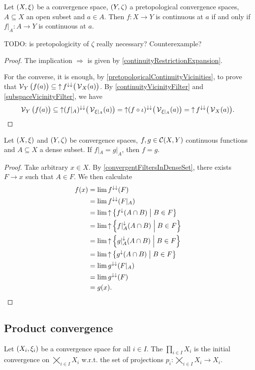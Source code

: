 \begin{proposition} \label{continuityExpandedDomain}
Let $\sSet{X,\xi}$ be a convergence space, $\sSet{Y,\zeta}$ a pretopological convergence spaces, $A\subseteq X$ an open subset and $a\in A$. Then $f: X\to Y$ is continuous at $a$ \textup{if and only if} $f|_A: A\to Y$ is continuous at $a$.
\end{proposition}
TODO: is pretopologicity of $\zeta$ really necessary? Counterexample?
\begin{proof}
The implication $\Rightarrow$ is given by \ref{continuityRestrictionExpansion}.

For the converse, it is enough, by \ref{pretopologicalContinuityVicinities}, to prove that $\operatorname{\mathcal{V}}_Y\big(f(a)\big) \subseteq \operatorname{\uparrow} f^{\downarrow\downarrow}\big(\operatorname{\mathcal{V}}_{X}(a)\big)$.
By \ref{continuityVicinityFilter} and \ref{subspaceVicinityFilter}, we have
\[ \operatorname{\mathcal{V}}_Y\big(f(a)\big) \subseteq \operatorname{\uparrow} (f|_A)^{\downarrow\downarrow}\big(\operatorname{\mathcal{V}}_{\xi|_A}(a)\big) = \operatorname{\uparrow} (f\circ \iota)^{\downarrow\downarrow}\big(\operatorname{\mathcal{V}}_{\xi|_A}(a)\big) = \operatorname{\uparrow} f^{\downarrow\downarrow}\big(\operatorname{\mathcal{V}}_{X}(a)\big). \]
\end{proof}

\begin{lemma} \label{denseSetDeterminesContinuousFunction}
Let $\sSet{X,\xi}$ and $\sSet{Y, \zeta}$ be convergence spaces, $f,g\in \operatorname{\mathcal{C}}(X,Y)$ continuous functions and $A\subseteq X$ a dense subset. If $f|_A = g|_A$, then $f = g$.
\end{lemma}
\begin{proof}
Take arbitrary $x \in X$. By \ref{convergentFiltersInDenseSet}, there exists $F\to x$ such that $A\in F$. We then calculate
\begin{align*}
f(x) &= \lim f^{\imf\imf}(F) \\
&= \lim f^{\imf\imf}(F|_A) \\
&= \lim \upset \setbuilder{f^\imf(A\cap B)}{B\in F} \\
&= \lim \upset \setbuilder{f|_A^\imf(A\cap B)}{B\in F} \\
&= \lim \upset \setbuilder{g|_A^\imf(A\cap B)}{B\in F} \\
&= \lim \upset \setbuilder{g^\imf(A\cap B)}{B\in F} \\
&= \lim g^{\imf\imf}(F|_A) \\
&= \lim g^{\imf\imf}(F) \\
&= g(x).
\end{align*}
\end{proof}

\subsection{Product convergence}
\begin{definition}
Let $\sSet{X_i, \xi_i}$ be a convergence space for all $i\in I$. The  $\prod_{i\in I}X_i$ is the initial convergence on $\bigtimes_{i\in I}X_i$ w.r.t. the set of projections $p_i: \bigtimes_{i\in I}X_i \to X_i$.
\end{definition}

